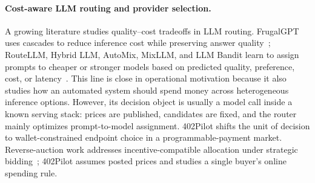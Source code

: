 \paragraph{Cost-aware LLM routing and provider selection.}
A growing literature studies quality--cost tradeoffs in LLM routing. FrugalGPT uses cascades to reduce inference cost while preserving answer quality~\citep{chen2023frugalgpt}; RouteLLM, Hybrid LLM, AutoMix, MixLLM, and LLM Bandit learn to assign prompts to cheaper or stronger models based on predicted quality, preference, cost, or latency~\citep{ong2024routellm,ding2024hybridllm,madaan2024automix,mixllm2024,llmbandit2025}. This line is close in operational motivation because it also studies how an automated system should spend money across heterogeneous inference options. However, its decision object is usually a model call inside a known serving stack: prices are published, candidates are fixed, and the router mainly optimizes prompt-to-model assignment. 402Pilot shifts the unit of decision to wallet-constrained endpoint choice in a programmable-payment market. Reverse-auction work addresses incentive-compatible allocation under strategic bidding~\citep{patra2026reverseauction}; 402Pilot assumes posted prices and studies a single buyer's online spending rule.
